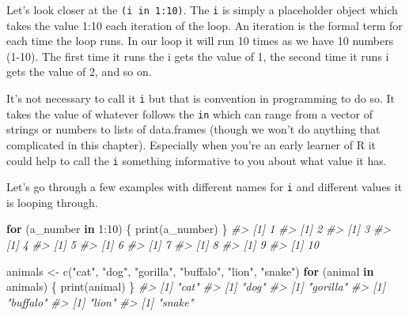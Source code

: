 \documentclass[
]{krantz}
\makeatletter
\newenvironment{Shaded}{\begin{snugshade}}{\end{snugshade}}
\newcommand{\CommentTok}[1]{\textcolor[rgb]{0.37,0.37,0.37}{\textit{#1}}}
\newcommand{\ControlFlowTok}[1]{\textcolor[rgb]{0.27,0.27,0.27}{\textbf{#1}}}
\newcommand{\DecValTok}[1]{\textcolor[rgb]{0.06,0.06,0.06}{#1}}
\newcommand{\FunctionTok}[1]{\textcolor[rgb]{0,0,0}{#1}}
\newcommand{\NormalTok}[1]{#1}
\newcommand{\OtherTok}[1]{\textcolor[rgb]{0.37,0.37,0.37}{#1}}
\newcommand{\SpecialCharTok}[1]{\textcolor[rgb]{0,0,0}{#1}}
\newcommand{\StringTok}[1]{\textcolor[rgb]{0.5,0.5,0.5}{#1}}
\newenvironment{kframe}{%
\medskip{}
\setlength{\fboxsep}{.8em}
 \def\at@end@of@kframe{}%
 \ifinner\ifhmode%
  \def\at@end@of@kframe{\end{minipage}}%
  \begin{minipage}{\columnwidth}%
 \fi\fi%
 \def\FrameCommand##1{\hskip\@totalleftmargin \hskip-\fboxsep
 \colorbox{shadecolor}{##1}\hskip-\fboxsep
     \hskip-\linewidth \hskip-\@totalleftmargin \hskip\columnwidth}%
 \MakeFramed {\advance\hsize-\width
   \@totalleftmargin\z@ \linewidth\hsize
   \@setminipage}}%
 {\par\unskip\endMakeFramed%
 \at@end@of@kframe}
\renewenvironment{Shaded}{\begin{kframe}}{\end{kframe}}
\makeatother
\begin{document}
Let's look closer at the \texttt{(i\ in\ 1:10)}. The \texttt{i} is simply a placeholder object which takes the value 1:10 each iteration of the loop. An iteration is the formal term for each time the loop runs. In our loop it will run 10 times as we have 10 numbers (1-10). The first time it runs the i gets the value of 1, the second time it runs i gets the value of 2, and so on.

It's not necessary to call it \texttt{i} but that is convention in programming to do so. It takes the value of whatever follows the \texttt{in} which can range from a vector of strings or numbers to lists of data.frames (though we won't do anything that complicated in this chapter). Especially when you're an early learner of R it could help to call the \texttt{i} something informative to you about what value it has.

Let's go through a few examples with different names for \texttt{i} and different values it is looping through.

\begin{Shaded}
\begin{Highlighting}[]
\ControlFlowTok{for}\NormalTok{ (a\_number }\ControlFlowTok{in} \DecValTok{1}\SpecialCharTok{:}\DecValTok{10}\NormalTok{) \{}
   \FunctionTok{print}\NormalTok{(a\_number)}
\NormalTok{\}}
\CommentTok{\#\textgreater{} [1] 1}
\CommentTok{\#\textgreater{} [1] 2}
\CommentTok{\#\textgreater{} [1] 3}
\CommentTok{\#\textgreater{} [1] 4}
\CommentTok{\#\textgreater{} [1] 5}
\CommentTok{\#\textgreater{} [1] 6}
\CommentTok{\#\textgreater{} [1] 7}
\CommentTok{\#\textgreater{} [1] 8}
\CommentTok{\#\textgreater{} [1] 9}
\CommentTok{\#\textgreater{} [1] 10}
\end{Highlighting}
\end{Shaded}

\begin{Shaded}
\begin{Highlighting}[]
\NormalTok{animals }\OtherTok{\textless{}{-}} \FunctionTok{c}\NormalTok{(}\StringTok{"cat"}\NormalTok{, }\StringTok{"dog"}\NormalTok{, }\StringTok{"gorilla"}\NormalTok{, }\StringTok{"buffalo"}\NormalTok{, }\StringTok{"lion"}\NormalTok{, }\StringTok{"snake"}\NormalTok{)}
\ControlFlowTok{for}\NormalTok{ (animal }\ControlFlowTok{in}\NormalTok{ animals) \{}
   \FunctionTok{print}\NormalTok{(animal)}
\NormalTok{\}}
\CommentTok{\#\textgreater{} [1] "cat"}
\CommentTok{\#\textgreater{} [1] "dog"}
\CommentTok{\#\textgreater{} [1] "gorilla"}
\CommentTok{\#\textgreater{} [1] "buffalo"}
\CommentTok{\#\textgreater{} [1] "lion"}
\CommentTok{\#\textgreater{} [1] "snake"}
\end{Highlighting}
\end{Shaded}
\end{document}
